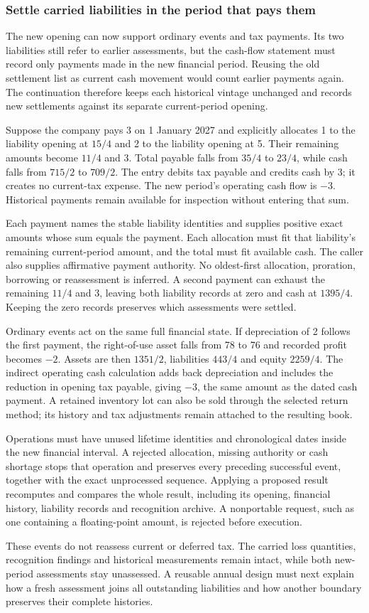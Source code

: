 
\subsubsection*{Settle carried liabilities in the period that pays them}
The new opening can now support ordinary events and tax payments. Its two
liabilities still refer to earlier assessments, but the cash-flow statement
must record only payments made in the new financial period. Reusing the old
settlement list as current cash movement would count earlier payments again.
The continuation therefore keeps each historical vintage unchanged and records
new settlements against its separate current-period opening.

Suppose the company pays 3 on 1 January 2027 and explicitly allocates 1 to the
liability opening at $15/4$ and 2 to the liability opening at 5. Their remaining
amounts become $11/4$ and 3. Total payable falls from $35/4$ to $23/4$, while
cash falls from $715/2$ to $709/2$. The entry debits tax payable and credits cash
by 3; it creates no current-tax expense. The new period's operating cash flow
is $-3$. Historical payments remain available for inspection without entering
that sum.

Each payment names the stable liability identities and supplies positive exact
amounts whose sum equals the payment. Each allocation must fit that liability's
remaining current-period amount, and the total must fit available cash. The
caller also supplies affirmative payment authority. No oldest-first allocation,
proration, borrowing or reassessment is inferred. A second payment can exhaust
the remaining $11/4$ and 3, leaving both liability records at zero and cash at
$1395/4$. Keeping the zero records preserves which assessments were settled.

Ordinary events act on the same full financial state. If depreciation of 2
follows the first payment, the right-of-use asset falls from 78 to 76 and
recorded profit becomes $-2$. Assets are then $1351/2$, liabilities $443/4$ and
equity $2259/4$. The indirect operating cash calculation adds back depreciation
and includes the reduction in opening tax payable, giving $-3$, the same amount
as the dated cash payment. A retained inventory lot can also be sold through
the selected return method; its history and tax adjustments remain attached to
the resulting book.

Operations must have unused lifetime identities and chronological dates inside
the new financial interval. A rejected allocation, missing authority or cash
shortage stops that operation and preserves every preceding successful event,
together with the exact unprocessed sequence. Applying a proposed result
recomputes and compares the whole result, including its opening, financial
history, liability records and recognition archive. A nonportable request,
such as one containing a floating-point amount, is rejected before execution.

These events do not reassess current or deferred tax. The carried loss
quantities, recognition findings and historical measurements remain intact,
while both new-period assessments stay unassessed. A reusable annual design
must next explain how a fresh assessment joins all outstanding liabilities and
how another boundary preserves their complete histories.
